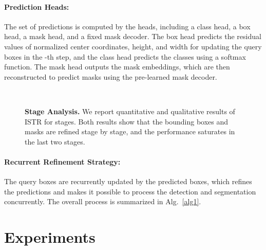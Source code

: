 \documentclass[10pt,twocolumn,letterpaper]{article}
\begin{document}
\paragraph{Prediction Heads:} The set of predictions is computed by the heads, including a class head, a box head, a mask head, and a fixed mask decoder.
The box head predicts the residual values of normalized center coordinates, height, and width for updating the query boxes  in the -th step, and the class head predicts the classes using a softmax function.
The mask head outputs the mask embeddings, which are then reconstructed to predict masks using the pre-learned mask decoder.
\begin{figure*}[t]
\centering
{}\vspace{-3.mm}\\
\hspace{4mm}
\vspace{-2.mm}
\caption{
\textbf{Stage Analysis.} We report quantitative and qualitative results of ISTR for  stages. Both results show that the bounding boxes and masks are refined stage by stage, and the performance saturates in the last two stages.
}\vspace{-0.5mm}
\label{fig3}
\end{figure*}
\paragraph{Recurrent Refinement Strategy:} The query boxes  are recurrently updated by the predicted boxes, which refines the predictions and makes it possible to process the detection and segmentation concurrently.
The overall process is summarized in Alg.~\ref{alg1}.
\section{Experiments}
\end{document}
